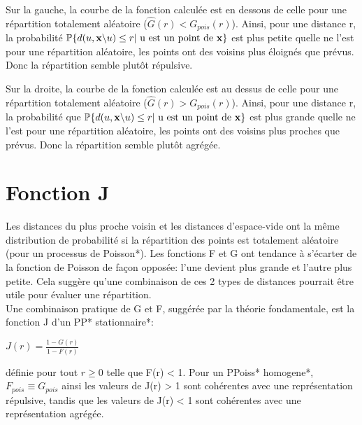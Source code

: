 \documentclass[stage2a]{tnreport}
\begin{document}
Sur la gauche, la courbe de la fonction calculée est en dessous de celle pour une répartition totalement aléatoire (\begin{math}\hat{G}(r) < G_{pois}(r) \end{math}). Ainsi, pour une distance r, la probabilité  \begin{math} \mathbb{P}\{ d(u,\textbf{x}\backslash u) \leq r | \text{ u est un point de \textbf{x}} \} \end{math} est plus petite quelle ne l'est pour une répartition aléatoire, les points ont des voisins plus éloignés que prévus. Donc la répartition semble plutôt répulsive.

Sur la droite, la courbe de la fonction calculée est au dessus de celle pour une répartition totalement aléatoire (\begin{math}\hat{G}(r) > G_{pois}(r) \end{math}). Ainsi, pour une distance r, la probabilité que \begin{math} \mathbb{P}\{ d(u,\textbf{x}\backslash u) \leq r | \text{ u est un point de \textbf{x}} \} \end{math} est plus grande quelle ne l'est pour une répartition aléatoire, les points ont des voisins plus proches que prévus. Donc la répartition semble plutôt agrégée.


\section{Fonction J}

Les distances du plus proche voisin et les distances d'espace-vide ont la même distribution de probabilité si la répartition des points est totalement aléatoire (pour un processus de Poisson*). Les fonctions F et G ont tendance à s'écarter de la fonction de Poisson de façon opposée: l'une devient plus grande et l'autre plus petite. Cela suggère qu'une combinaison de ces 2 types de distances pourrait être utile pour évaluer une répartition.\\
Une combinaison pratique de G et F, suggérée par la théorie fondamentale, est la fonction J d'un \gls{PP}* \gls{stationnaire}*:
\begin{center}\begin{math} J(r) = \frac{1-G(r)}{1-F(r)} \end{math}\end{center}
définie pour tout \begin{math} r \geq 0 \end{math} telle que F(r) < 1. Pour un \gls{PPoiss}* \gls{homogene}*, \begin{math} F_{pois} \equiv G_{pois} \end{math} ainsi les valeurs de J(r) > 1 sont cohérentes avec une représentation répulsive, tandis que les valeurs de J(r) < 1 sont cohérentes avec une représentation agrégée.
\end{document}
